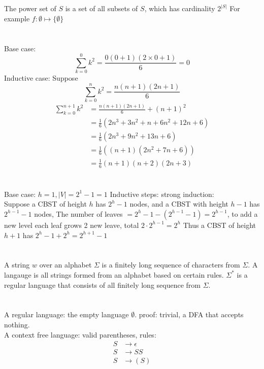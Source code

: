 \documentclass{article}
\begin{document}
\section{}
The power set of $S$ is a set of all subsets of $S$, which has cardinality $2^{|S|}$ For example $f: \emptyset \mapsto \{\emptyset\}$
\section{}
Base case: 
\[\sum_{k=0}^{0} k^2 = \frac{0(0+1)(2\times0+1)}{6} = 0\]
Inductive case: Suppose 
\[\sum_{k=0}^{n}k^2 = \frac{n(n+1)(2n+1)}{6}\]
\begin{align*}
  \sum_{k=0}^{n+1}k^2 &= \frac{n(n+1)(2n+1)}{6} + (n+1)^2\\
  &= \frac{1}{6}(2n^3 + 3n^2 + n + 6n^2 + 12n + 6)\\
  &= \frac{1}{6}(2n^3 + 9n^2 + 13n + 6)\\
  &= \frac{1}{6}((n+1)(2n^2+7n+6))\\
  &= \frac{1}{6}(n+1)(n+2)(2n+3) 
\end{align*}
\section{}
Base case: $h = 1, |V| = 2^1 - 1 = 1$
Inductive steps: strong induction: \\
Suppose a CBST of height $h$ has $2^h - 1$ nodes, and a CBST with height $h - 1$ has $2^{h - 1} - 1$ nodes, 
The number of leaves $ = 2^{h} - 1 - (2^{h - 1} - 1) = 2^{h - 1}$, to add a new level each leaf grows 2 new leave, total $2 \cdot 2^{h - 1} = 2^h$
Thus a CBST of height $h + 1$ has $2^h - 1 + 2^h = 2^{h+1} - 1$
\section{}
A string $w$ over an alphabet $\Sigma$ is a finitely long sequence of characters from $\Sigma$. A langauge is all strings formed from an alphabet based on certain rules. 
$\Sigma^*$ is a regular language that consists of all finitely long sequence from $\Sigma$.
\section{}
A regular language: the empty language $\emptyset$. proof: trivial, a DFA that accepts nothing.\\
A context free language: valid parentheses, rules:
\begin{align*}
  S &\rightarrow \epsilon\\
  S &\rightarrow SS  \\
  S &\rightarrow (S)
\end{align*}
\end{document}
